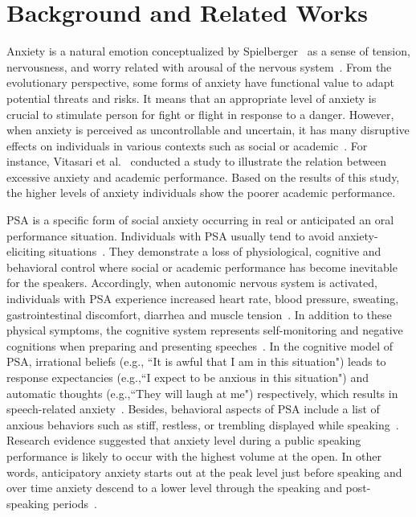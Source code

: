 \documentclass{llncs}
\begin{document}
\section{Background and Related Works}

Anxiety is a natural emotion conceptualized by Spielberger~\cite{spielberger1983manual} as a sense of tension, nervousness, and worry related with arousal of the nervous system~\cite{vitasari2010relationship}. From the evolutionary perspective, some forms of anxiety have functional value to adapt potential threats and risks. It means that an appropriate level of anxiety is crucial to stimulate person for fight or flight in response to a danger. However, when anxiety is perceived as uncontrollable and uncertain, it has many disruptive effects on individuals in various contexts such as social or academic~\cite{maner2010adaptations}. For instance, Vitasari et al.~\cite{vitasari2010relationship} conducted a study to illustrate the relation between excessive anxiety and academic performance. Based on the results of this study, the higher levels of anxiety individuals show the poorer academic performance. 

PSA is a specific form of social anxiety occurring in real or anticipated an oral performance situation. Individuals with PSA usually tend to avoid anxiety-eliciting situations~\cite{harris2002brief}. They demonstrate a loss of physiological, cognitive and behavioral control where social or academic performance has become inevitable for the speakers. Accordingly, when autonomic nervous system is activated, individuals with PSA experience increased heart rate, blood pressure, sweating, gastrointestinal discomfort, diarrhea and muscle tension~\cite{bernatova2016lack,granigg2013essential}. In addition to these physical symptoms, the cognitive system represents self-monitoring and negative cognitions when preparing and presenting speeches~\cite{bodie2010racing}. In the cognitive model of PSA, irrational beliefs (e.g., ``It is awful that I am in this situation") leads to response expectancies (e.g.,``I expect to be anxious in this situation") and automatic thoughts (e.g.,``They will laugh at me") respectively, which results in speech-related anxiety~\cite{vislua2013core}. Besides, behavioral aspects of PSA include a list of anxious behaviors such as stiff, restless, or trembling displayed while speaking~\cite{bodie2010racing}. Research evidence suggested that anxiety level during a public speaking performance is likely to occur with the highest volume at the open. In other words, anticipatory anxiety starts out at the peak level just before speaking and over time anxiety descend to a lower level through the speaking and post-speaking periods~\cite{behnke1999milestones}.
\end{document}
